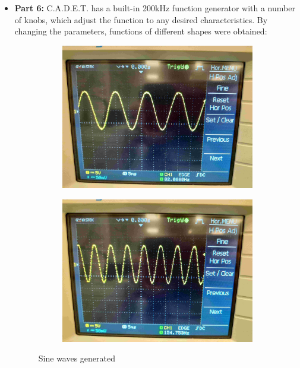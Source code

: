 \documentclass[pdftex,12pt,a4paper]{article}
\begin{document}
\begin{itemize}
    \item \textbf{Part 6:}
    C.A.D.E.T. has a built-in 200kHz function generator with a number of knobs, which adjust the function to any desired characteristics. By changing the parameters, functions of different shapes were obtained:
    
\begin{figure}[H]
\begin{subfigure}{0.5\textwidth}
\centering
\includegraphics[width=.95\linewidth]{sine_wave_1.jpg}
\end{subfigure}%
\begin{subfigure}{0.5\textwidth}
\centering
\includegraphics[width=.95\linewidth]{sine_wave_2.jpg}
\end{subfigure}
\caption{Sine waves generated}
\end{figure}


\end{itemize}
\end{document}
